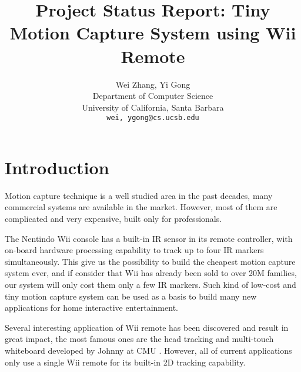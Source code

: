 \documentclass[10pt,twocolumn,letterpaper]{article}
\begin{document}
\title{Project Status Report: Tiny Motion Capture System using Wii Remote}

\author{Wei Zhang, Yi Gong\\
Department of Computer Science\\
University of California, Santa Barbara\\
{\tt\small wei, ygong@cs.ucsb.edu}\\
}

\maketitle
\thispagestyle{empty}



\section{Introduction}
Motion capture technique is a well studied area in the past decades, 
many commercial systems are available in the market. However, most of them 
are complicated and very expensive, built only for professionals.

The Nentindo Wii console has a built-in IR sensor in its remote
controller, with on-board hardware processing capability to track
up to four IR markers simultaneously. This give us the possibility
to build the cheapest motion capture system ever, 
and if consider that Wii has
already been sold to over 20M families, 
our system will only cost them only a few IR markers. 
Such kind of low-cost and tiny motion capture system can be used as a basis 
to build many new applications for home interactive entertainment.

Several interesting application of Wii remote has been discovered 
and result in great impact, the most famous ones are the head tracking
and multi-touch whiteboard developed by Johnny at CMU\cite{JohnnyVR} \cite{JohnnyTouch}.
However, all of current applications only use a single Wii remote for 
its built-in 2D tracking capability.
\end{document}
